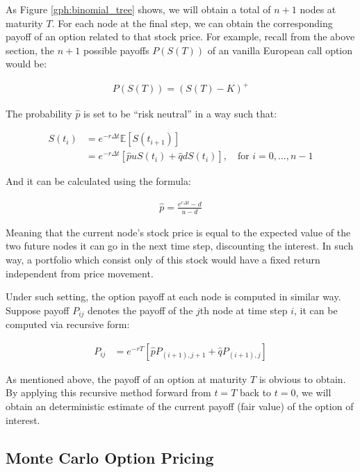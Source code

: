 As Figure \ref{gph:binomial_tree} shows, we will obtain a total of $n+1$ nodes at maturity $T$. For each node at the final step, we can obtain the corresponding payoff of an option related to that stock price. For example, recall from the above section, the $n+1$ possible payoffs $P(S(T))$ of an vanilla European call option would be:

\begin{align}
P(S(T))=(S(T)-K)^+
\end{align}

The probability $\hat{p}$ is set to be ``risk neutral'' in a way such that:

\begin{align*}
S(t_{i}) &= e^{-r\Delta t}\mathbb{E}[S(t_{i+1})] \\
		 &= e^{-r\Delta t}[\hat{p}uS(t_i)+\hat{q}dS(t_i)],\quad\text{for }i=0,...,n-1
\end{align*}

And it can be calculated using the formula:

\begin{align} \label{eq:binomial_riskless_p}
\hat{p} = \frac{e^{r\Delta t}-d}{u-d}
\end{align}

Meaning that the current node's stock price is equal to the expected value of the two future nodes it can go in the next time step, discounting the interest. In such way, a portfolio which consist only of this stock would have a fixed return independent from price movement.

Under such setting, the option payoff at each node is computed in similar way. Suppose payoff $P_{ij}$ denotes the payoff of the $j$th node at time step $i$, it can be computed via recursive form:

\begin{align} \label{eq:binomial_recursive}
P_{ij} &= e^{-rT}[\hat{p}P_{(i+1),j+1} + \hat{q}P_{(i+1),j}]
\end{align}

As mentioned above, the payoff of an option at maturity $T$ is obvious to obtain. By applying this recursive method forward from $t=T$ back to $t=0$, we will obtain an deterministic estimate of the current payoff (fair value) of the option of interest.

\subsection{Monte Carlo Option Pricing}

